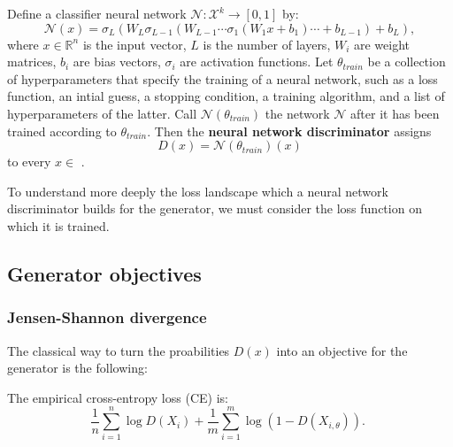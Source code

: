 \begin{definition}
    Define a classifier neural network $\mathcal{N}: \mathcal{X}^k \rightarrow [0, 1]$ by: %
    \begin{equation} 
        \mathcal{N}(x) = \sigma_L(W_L \sigma_{L-1}(W_{L-1} \cdots \sigma_1(W_1 x + b_1) \cdots + b_{L-1}) + b_L),
    \end{equation}
    where $x \in \mathbb{R}^n$ is the input vector, $L$ is the number of layers, $W_i$ are weight matrices, $b_i$ are bias vectors, $\sigma_i$ are activation functions. %
    Let $\theta_{train}$ be a collection of hyperparameters that specify the training of a neural network, such as a loss function, an intial guess, a stopping condition, a training algorithm, and a list of hyperparameters of the latter. %
    Call $\mathcal{N}(\theta_{train})$ the network $\mathcal{N}$ after it has been trained according to $\theta_{train}$.
    Then the \textbf{neural network discriminator} assigns
    \begin{equation}
        D(x) = \mathcal{N}(\theta_{train})(x)
    \end{equation}
    to every $x \in$ . %
\end{definition}

To understand more deeply the loss landscape which a neural network discriminator builds for the generator, we must consider the loss function on which it is trained.

\subsection{Generator objectives}
\label{sec:losses}

\subsubsection{Jensen-Shannon divergence}
\label{sec:ce_loss}

The classical way to turn the proabilities $D(x)$ into an objective for the generator is the following: 

\begin{definition}[Cross-entropy loss] %
    The empirical cross-entropy loss (CE) is:
    $$
    \frac{1}{n} \sum_{i=1}^n \log D\left(X_i\right)+\frac{1}{m} \sum_{i=1}^m \log \left(1-D\left(X_{i, \theta}\right)\right) \text {. }
    $$    
\end{definition}

